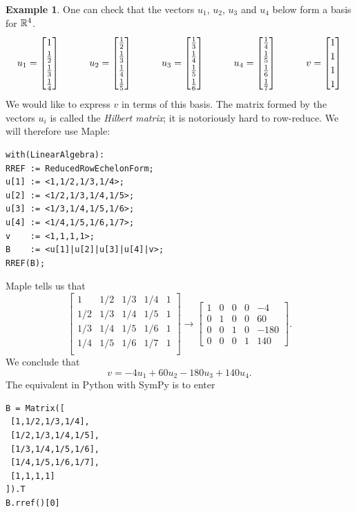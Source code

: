 \documentclass[reqno]{amsart}
\theoremstyle{definition}
\newtheorem{example}[theorem]{Example}
\newcommand{\dfn}[1]{\emph{{#1}}\index{#1}}
\begin{document}
\begin{example}
 One can check that the vectors $u_1$, $u_2$, $u_3$ and $u_4$ below
 form a basis for ${\mathbb{R}}^4$.
 \[ \renewcommand{\arraystretch}{1.2}
  u_1 = \bbm 1            \\ \tfrac{1}{2} \\ \tfrac{1}{3} \\ \tfrac{1}{4} \ebm
  \hspace{3em}
  u_2 = \bbm \tfrac{1}{2} \\ \tfrac{1}{3} \\ \tfrac{1}{4} \\ \tfrac{1}{5} \ebm
  \hspace{3em}
  u_3 = \bbm \tfrac{1}{3} \\ \tfrac{1}{4} \\ \tfrac{1}{5} \\ \tfrac{1}{6} \ebm
  \hspace{3em}
  u_4 = \bbm \tfrac{1}{4} \\ \tfrac{1}{5} \\ \tfrac{1}{6} \\ \tfrac{1}{7} \ebm
  \hspace{3em}
  v = \bbm 1 \\ 1 \\ 1 \\ 1 \ebm
 \]
 We would like to express $v$ in terms of this basis.  The matrix
 formed by the vectors $u_i$ is called the \dfn{Hilbert matrix}; it
 is notoriously hard to row-reduce.  We will therefore use Maple:
 \begin{verbatim}
with(LinearAlgebra):
RREF := ReducedRowEchelonForm;
u[1] := <1,1/2,1/3,1/4>;
u[2] := <1/2,1/3,1/4,1/5>;
u[3] := <1/3,1/4,1/5,1/6>;
u[4] := <1/4,1/5,1/6,1/7>;
v    := <1,1,1,1>;
B    := <u[1]|u[2]|u[3]|u[4]|v>;
RREF(B);
 \end{verbatim}
 Maple tells us that
 \[ \left[\begin{array}{cccc|c}
          1 &  1/2 &  1/3 &  1/4 &  1 \\
        1/2 &  1/3 &  1/4 &  1/5 &  1 \\
        1/3 &  1/4 &  1/5 &  1/6 &  1 \\
        1/4 &  1/5 &  1/6 &  1/7 &  1 \\
    \end{array}\right]
    \to
    \left[\begin{array}{cccc|c}
          1 &  0 &  0 &  0 & -4  \\
          0 &  1 &  0 &  0 & 60  \\
          0 &  0 &  1 &  0 & -180\\
          0 &  0 &  0 &  1 & 140
    \end{array}\right].
 \]
 We conclude that
 \[ v = -4 u_1 + 60 u_2 -180 u_3 + 140 u_4. \]
 The equivalent in Python with SymPy is to enter 
\begin{verbatim}
B = Matrix([
 [1,1/2,1/3,1/4],
 [1/2,1/3,1/4,1/5],
 [1/3,1/4,1/5,1/6],
 [1/4,1/5,1/6,1/7],
 [1,1,1,1]
]).T
B.rref()[0]
\end{verbatim}
\end{example}
\end{document}
